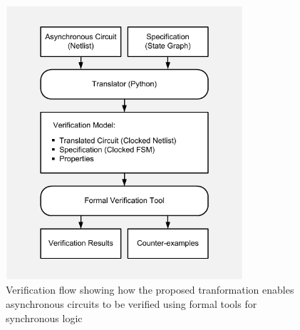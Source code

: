 
\begin{figure}[!t]
\begin{center}

\includegraphics[width=8.8cm]{figures/fig_flow}

\caption{
Verification flow showing how the proposed tranformation enables asynchronous circuits to be verified using formal tools for synchronous logic
}

\label{fig_flow}
\end{center}

\end{figure}

